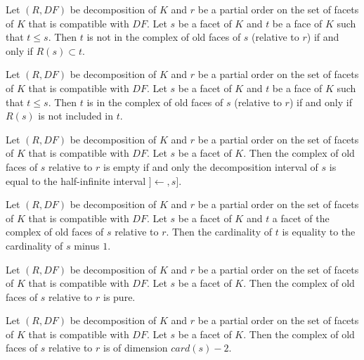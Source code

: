 \begin{sublemma}[OldFacesDecomposition']
Let $(R,DF)$ be decomposition of $K$ and $r$ be a partial order on the set of
facets of $K$ that is compatible with $DF$. Let $s$ be a facet of $K$ and $t$ be a face of $K$ such that $t\le s$.
Then $t$ is not in the complex of old faces of $s$ (relative to $r$) if and only if $R(s)\subset t$.

\end{sublemma}

\begin{sublemma}
Let $(R,DF)$ be decomposition of $K$ and $r$ be a partial order on the set of
facets of $K$ that is compatible with $DF$. Let $s$ be a facet of $K$ and $t$ be a face of $K$ such that $t\le s$.
Then $t$ is in the complex of old faces of $s$ (relative to $r$) if and only if $R(s)$ is not included in $t$.

\end{sublemma}

\begin{sublemma}
Let $(R,DF)$ be decomposition of $K$ and $r$ be a partial order on the set of
facets of $K$ that is compatible with $DF$. Let $s$ be a facet of $K$. Then the complex of old faces of $s$ relative
to $r$ is empty if and only the decomposition interval of $s$ is equal to the half-infinite interval $]\leftarrow,s]$.

\end{sublemma}

\begin{sublemma}[OldFacesDecompositionDimensionFacets]
Let $(R,DF)$ be decomposition of $K$ and $r$ be a partial order on the set of
facets of $K$ that is compatible with $DF$. Let $s$ be a facet of $K$ and $t$ a facet of the complex of old faces of $s$ relative
to $r$. Then the cardinality of $t$ is equality to the cardinality of $s$ minus $1$.

\end{sublemma}

\begin{sublemma}[OldFacesDecompositionIsPure]
Let $(R,DF)$ be decomposition of $K$ and $r$ be a partial order on the set of
facets of $K$ that is compatible with $DF$. Let $s$ be a facet of $K$. Then the complex of old faces of $s$ relative
to $r$ is pure.

\end{sublemma}

\begin{sublemma}[OldFacesDecompositionDimension]
Let $(R,DF)$ be decomposition of $K$ and $r$ be a partial order on the set of
facets of $K$ that is compatible with $DF$. Let $s$ be a facet of $K$. Then the complex of old faces of $s$ relative
to $r$ is of dimension $card(s)-2$.

\end{sublemma}


